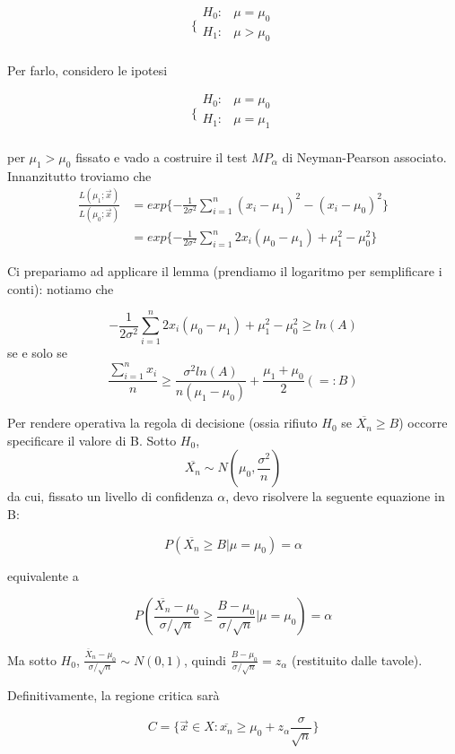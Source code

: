 $$\bigg \{
\begin{array}{rl}
H_0: & \mu = \mu_0 \\
H_1: & \mu > \mu_0 \\
\end{array}
$$

Per farlo, considero le ipotesi

$$\bigg \{
\begin{array}{rl}
H_0: & \mu = \mu_0 \\
H_1: & \mu = \mu_1 \\
\end{array}
$$

per $\mu_1 > \mu_0$ fissato e vado a costruire il test $MP_\alpha$ di Neyman-Pearson associato.
Innanzitutto troviamo che
\begin{align*}
\frac{L(\mu_1;\vec{x})}{L(\mu_0;\vec{x})} 
&= exp\{ -\frac{1}{2\sigma^2} \sum_{i=1}^n (x_i - \mu_1)^2 - (x_i - \mu_0)^2 \}
\\&= exp\{ -\frac{1}{2\sigma^2} \sum_{i=1}^n 2x_i(\mu_0 - \mu_1) +\mu_1^2 - \mu_0^2 \}
\end{align*}

Ci prepariamo ad applicare il lemma (prendiamo il logaritmo per semplificare i conti): notiamo che

$$ -\frac{1}{2\sigma^2} \sum_{i=1}^n 2x_i(\mu_0 - \mu_1) +\mu_1^2 - \mu_0^2 \geq ln(A)$$
se e solo se
$$\frac{\sum_{i=1}^n x_i}{n} \geq \frac{\sigma^2 ln(A)}{n(\mu_1 - \mu_0)} + \frac{\mu_1 + \mu_0}{2} (=:B)$$

Per rendere operativa la regola di decisione (ossia rifiuto $H_0$ se $\overline{X_n} \geq B$)
occorre specificare il valore di B. 
Sotto $H_0$, $$\overline{X_n} \sim N(\mu_0, \frac{\sigma^2}{n})$$
da cui, fissato un livello di confidenza $\alpha$, devo risolvere la seguente equazione in B:

$$P(\overline{X_n} \geq B | \mu=\mu_0) = \alpha$$

equivalente a

$$P(\frac{\overline{X_n} - \mu_0} {\sigma/\sqrt{n}} \geq \frac{B - \mu_0} {\sigma/\sqrt{n}} | \mu=\mu_0) = \alpha$$

Ma sotto $H_0$, $\frac{\overline{X}_n - \mu_0} {\sigma/\sqrt{n}} \sim N(0,1)$, quindi  $\frac{B - \mu_0} {\sigma/\sqrt{n}} = z_\alpha$ (restituito dalle tavole).

Definitivamente, la regione critica sarà

$$C=\{ \vec{x} \in X : \overline{x_n} \geq \mu_0 + z_\alpha \frac{\sigma}{\sqrt{n}} \}$$ 

